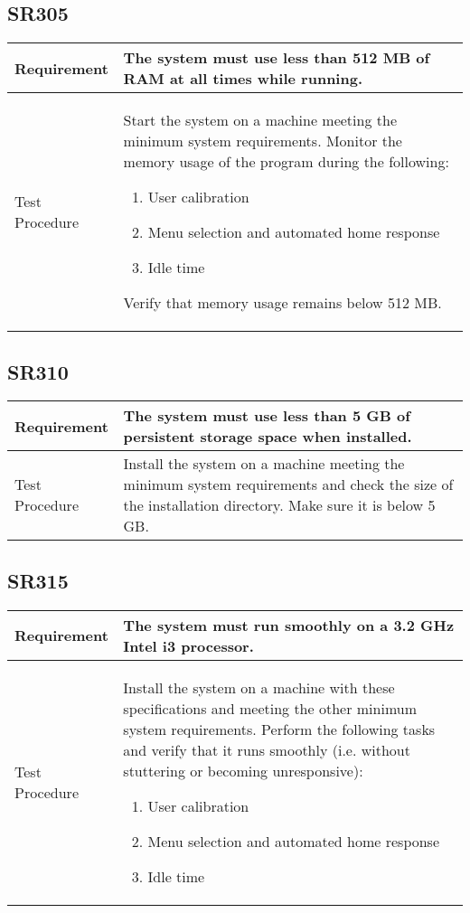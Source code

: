 \documentclass{article}
\begin{document}
\subsection{SR305}
\begin{tabular}{| l | p{12cm}  |}
    \hline
	Requirement & The system must use less than 512 MB of RAM at all times while running. \\ \hline
	Test Procedure & Start the system on a machine meeting the minimum system
	requirements. Monitor the memory usage of the program during the
	following:
	\begin{enumerate}
	    \item User calibration
	    \item Menu selection and automated home response
	    \item Idle time
	\end{enumerate}
	Verify that memory usage remains below 512 MB. \\ \hline
\end{tabular}
\subsection{SR310}
\begin{tabular}{| l | p{12cm}  |}
    \hline
	Requirement & The system must use less than 5 GB of persistent storage
	space when installed. \\ \hline
	Test Procedure & Install the system on a machine meeting the minimum
	system requirements and check the size of the installation directory. Make
	sure it is below 5 GB. \\ \hline
\end{tabular}
\subsection{SR315}
\begin{tabular}{| l | p{12cm}  |}
    \hline
	Requirement & The system must run smoothly on a 3.2 GHz Intel i3 processor. \\ \hline
	Test Procedure & Install the system on a machine with these specifications
	and meeting the other minimum system requirements. Perform the following
	tasks and verify that it runs smoothly (i.e. without stuttering or
	becoming unresponsive):
	\begin{enumerate}
	    \item User calibration
	    \item Menu selection and automated home response
	    \item Idle time
	\end{enumerate}
	\\ \hline
\end{tabular}
\end{document}
